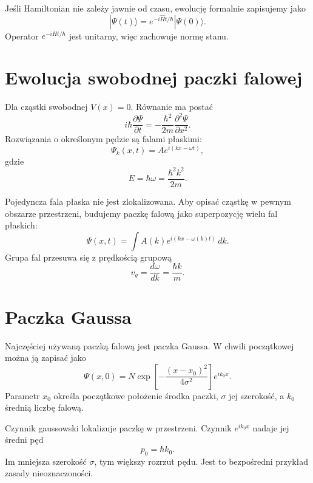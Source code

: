 Jeśli Hamiltonian nie zależy jawnie od czasu, ewolucję formalnie zapisujemy jako
\begin{equation}
    |\Psi(t)\rangle=e^{-i\hat{H}t/\hbar}|\Psi(0)\rangle.
\end{equation}
Operator \(e^{-i\hat{H}t/\hbar}\) jest unitarny, więc zachowuje normę stanu.

\section{Ewolucja swobodnej paczki falowej}

Dla cząstki swobodnej \(V(x)=0\). Równanie ma postać
\begin{equation}
    i\hbar\frac{\partial\Psi}{\partial t}
    =-\frac{\hbar^2}{2m}\frac{\partial^2\Psi}{\partial x^2}.
\end{equation}
Rozwiązania o określonym pędzie są falami płaskimi:
\begin{equation}
    \Psi_k(x,t)=Ae^{i(kx-\omega t)},
\end{equation}
gdzie
\begin{equation}
    E=\hbar\omega=\frac{\hbar^2k^2}{2m}.
\end{equation}

Pojedyncza fala płaska nie jest zlokalizowana. Aby opisać cząstkę w pewnym obszarze przestrzeni, budujemy paczkę falową jako superpozycję wielu fal płaskich:
\begin{equation}
    \Psi(x,t)=\int A(k)e^{i(kx-\omega(k)t)}\,dk.
\end{equation}
Grupa fal przesuwa się z prędkością grupową
\begin{equation}
    v_g=\frac{d\omega}{dk}=\frac{\hbar k}{m}.
\end{equation}

\section{Paczka Gaussa}

Najczęściej używaną paczką falową jest paczka Gaussa. W chwili początkowej można ją zapisać jako
\begin{equation}
    \Psi(x,0)=N\exp\left[-\frac{(x-x_0)^2}{4\sigma^2}\right]e^{ik_0x}.
\end{equation}
Parametr \(x_0\) określa początkowe położenie środka paczki, \(\sigma\) jej szerokość, a \(k_0\) średnią liczbę falową.

Czynnik gaussowski lokalizuje paczkę w przestrzeni. Czynnik \(e^{ik_0x}\) nadaje jej średni pęd
\begin{equation}
    p_0=\hbar k_0.
\end{equation}
Im mniejsza szerokość \(\sigma\), tym większy rozrzut pędu. Jest to bezpośredni przykład zasady nieoznaczoności.

